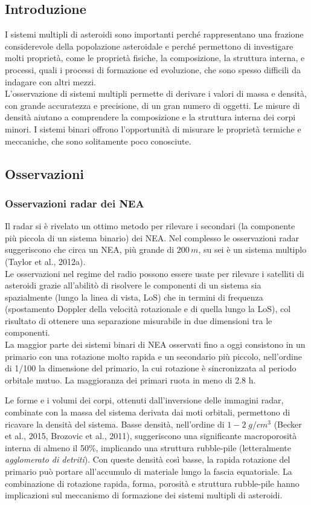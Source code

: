 \documentclass[a4paper,11pt,openright]{book}
\begin{document}
\subsection{Introduzione}
I sistemi multipli di asteroidi sono importanti perché rappresentano una frazione considerevole della popolazione asteroidale e perché permettono di investigare molti proprietà, come le proprietà fisiche, la composizione, la struttura interna, e processi, quali i processi di formazione ed evoluzione, che sono spesso difficili da indagare con altri mezzi.\\
L'osservazione di sistemi multipli permette di derivare i valori di massa e densità, con grande accuratezza e precisione, di un gran numero di oggetti. Le misure di densità aiutano a comprendere la composizione e la struttura interna dei corpi minori. I sistemi binari offrono l'opportunità di misurare le proprietà termiche e meccaniche, che sono solitamente poco conosciute.

\subsection{Osservazioni}
\subsubsection{Osservazioni radar dei NEA}
Il radar si è rivelato un ottimo metodo per rilevare i secondari (la componente più piccola di un sistema binario) dei NEA. Nel complesso le osservazioni radar suggeriscono che circa un NEA, più grande di $200\,m$, su sei è un sistema multiplo (Taylor et al., 2012a).\\
Le osservazioni nel regime del radio possono essere usate per rilevare i satelliti di asteroidi grazie all'abilitò di risolvere le componenti di un sistema sia spazialmente (lungo la linea di vista, LoS) che in termini di frequenza (spostamento Doppler della velocità rotazionale e di quella lungo la LoS), col risultato di ottenere una separazione misurabile in due dimensioni tra le componenti.\\
La maggior parte dei sistemi binari di NEA osservati fino a oggi consistono in un primario con una rotazione molto rapida e un secondario più piccolo, nell'ordine di 1/100 la dimensione del primario, la cui rotazione è sincronizzata al periodo orbitale mutuo. La maggioranza dei primari ruota in meno di 2.8 h.

Le forme e i volumi dei corpi, ottenuti dall'inversione delle immagini radar, combinate con la massa del sistema derivata dai moti orbitali, permettono di ricavare la densità del sistema. Basse densità, nell'ordine di $1-2\;g/cm^3$ (Becker et al., 2015, Brozovic et al., 2011), suggeriscono una significante macroporosità interna di almeno il 50\%, implicando una struttura rubble-pile (letteralmente \textit{agglomerato di detriti}). Con queste densità così basse, la rapida rotazione del primario può portare all'accumulo di materiale lungo la fascia equatoriale. La combinazione di rotazione rapida, forma, porosità e struttura rubble-pile hanno implicazioni sul meccanismo di formazione dei sistemi multipli di asteroidi.
\end{document}
